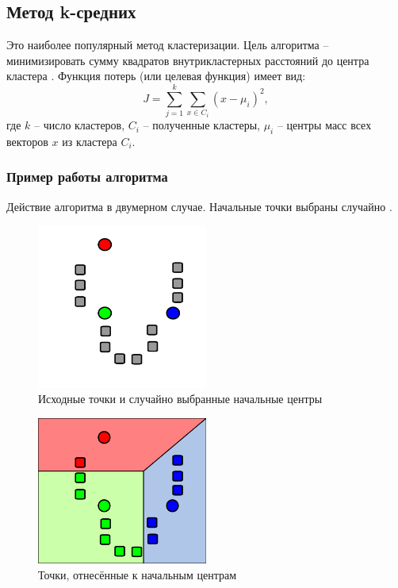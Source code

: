 \documentclass[bachelor, och, referat]{SCWorks}
\begin{document}
\subsection{Метод k-средних}
Это наиболее популярный метод кластеризации. Цель алгоритма -- минимизировать сумму квадратов внутрикластерных расстояний до центра кластера \cite{kmean1}. Функция потерь (или целевая функция) имеет вид:
\[ J = \sum_{j = 1}^{k} \sum_{x \in C_i} (x - \mu_i)^2 , \]
где $k$ -- число кластеров, $C_i$ -- полученные кластеры, $\mu_i$ --
центры масс всех векторов $x$ из кластера $C_i$.

\subsubsection{Пример работы алгоритма}
Действие алгоритма в двумерном случае. Начальные точки выбраны случайно \cite{kmean2}.
\begin{figure}[H]
    \centering
    \includegraphics[width=0.5\textwidth]{1.png}
    \caption{Исходные точки и случайно выбранные начальные центры}
\end{figure}

\begin{figure}[H]
    \centering
    \includegraphics[width=0.5\textwidth]{2.png}
    \caption{Точки, отнесённые к начальным центрам}
\end{figure}
\end{document}
